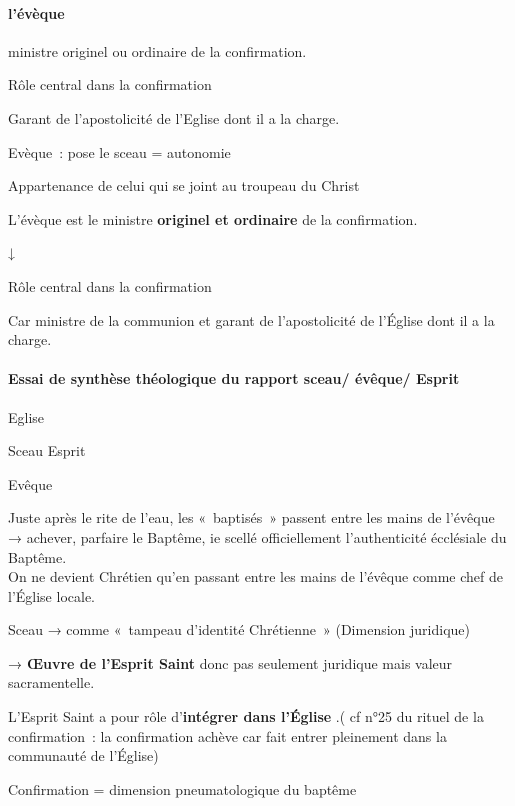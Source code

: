 \hypertarget{d.-luxe9vuxe8que}{%
\paragraph{{l'évèque }}\label{d.-luxe9vuxe8que}}

ministre originel ou ordinaire de la confirmation.

Rôle central dans la confirmation

Garant de l'apostolicité de l'Eglise dont il a la charge.

Evèque~: pose le sceau = autonomie

Appartenance de celui qui se joint au troupeau du Christ

L'évèque est le ministre \textbf{originel et ordinaire} de la
confirmation.

↓

Rôle central dans la confirmation

Car ministre de la communion et garant de l'apostolicité de l'Église
dont il a la charge.

\hypertarget{e.-essai-de-synthuxe8se-thuxe9ologique-du-rapport-sceau-uxe9vuxeaque-esprit}{%
\paragraph{Essai de synthèse théologique du rapport sceau/
évêque/
Esprit}\label{e.-essai-de-synthuxe8se-thuxe9ologique-du-rapport-sceau-uxe9vuxeaque-esprit}}

Eglise

Sceau Esprit

Evêque

Juste après le rite de l'eau, les «~baptisés~» passent entre les mains
de l'évêque → achever, parfaire le Baptême, ie scellé officiellement
l'authenticité écclésiale du Baptême.\\
On ne devient Chrétien qu'en passant entre les mains de l'évêque comme
chef de l'Église locale.

Sceau → comme «~tampeau d'identité Chrétienne~» (Dimension juridique)

→ \textbf{Œuvre de l'Esprit Saint} donc pas seulement juridique mais
valeur sacramentelle.

L'Esprit Saint a pour rôle d'\textbf{intégrer dans l'Église} .( cf n°25
du rituel de la confirmation~: la confirmation achève car fait entrer
pleinement dans la communauté de l'Église)

Confirmation = dimension pneumatologique du baptême

